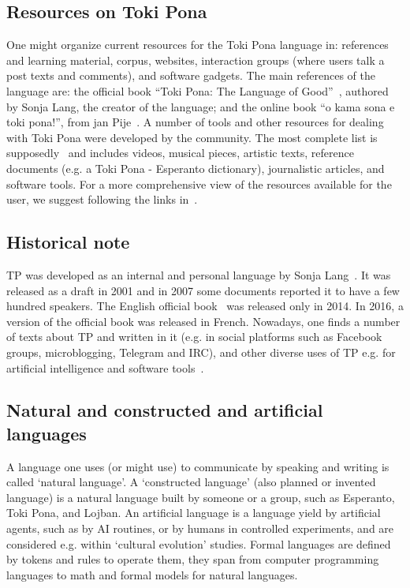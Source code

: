 \documentclass{article}
\begin{document}
\subsection{Resources on Toki Pona}
One might organize current resources for the Toki Pona
language in: references and learning material, corpus,
websites, interaction groups
(where users talk a post texts and comments), and software gadgets.
The main references of the language are:
  the official book ``Toki Pona: The Language of Good''~\cite{tpLang},
    authored by Sonja Lang, the creator of the language;
and the online book ``o kama sona e toki pona!'',
from jan Pije~\cite{kama}.
A number of tools and other resources for dealing with Toki Pona
were developed by the community.
The most complete list is supposedly~\cite{gdoc} and includes
videos, musical pieces, artistic texts, reference documents (e.g.
a Toki Pona - Esperanto dictionary), journalistic articles,
and software tools.
For a more comprehensive view of the resources available
for the user, we suggest following the links 
in~\cite{gdoc,wikiToki}.

\subsection{Historical note}
TP was developed as an internal and personal language
by Sonja Lang~\cite{interview}.
It was released as a draft in 2001 and in 2007 some documents
reported it to have a few hundred speakers.
The English official book~\cite{tpLang} was released only in 2014.
In 2016, a version of the official book was released in French.
Nowadays, one finds a number of texts about TP and written
in it
(e.g. in social platforms such as Facebook groups,
microblogging, Telegram and
IRC), and other diverse uses of TP e.g. for artificial intelligence and software tools~\cite{gdoc}. 

\subsection{Natural and constructed and artificial languages}
A language one uses (or might use) to communicate by speaking
and writing is called `natural language'.
A `constructed language' (also planned or invented language) is a natural language built by someone or
a group, such as Esperanto, Toki Pona, and Lojban.
An artificial language is a language yield by artificial agents,
such as by AI routines, or by humans in controlled experiments,
and are considered e.g. within `cultural evolution' studies.
Formal languages are defined by tokens and rules to
operate them, they span from computer programming languages
to math and formal models for natural languages.
\end{document}
